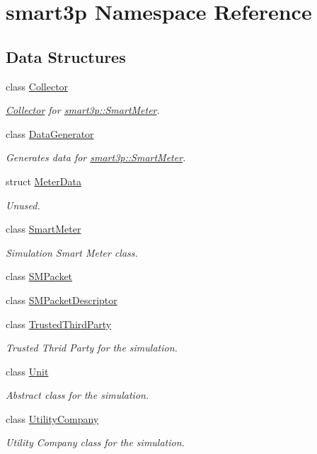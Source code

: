 \hypertarget{namespacesmart3p}{}\section{smart3p Namespace Reference}
\label{namespacesmart3p}
\subsection*{Data Structures}
\begin{DoxyCompactItemize}
\item 
class \hyperlink{classsmart3p_1_1Collector}{Collector}
\begin{DoxyCompactList}\small\item\em \hyperlink{classsmart3p_1_1Collector}{Collector} for \hyperlink{classsmart3p_1_1SmartMeter}{smart3p\+::\+Smart\+Meter}. \end{DoxyCompactList}\item 
class \hyperlink{classsmart3p_1_1DataGenerator}{Data\+Generator}
\begin{DoxyCompactList}\small\item\em Generates data for \hyperlink{classsmart3p_1_1SmartMeter}{smart3p\+::\+Smart\+Meter}. \end{DoxyCompactList}\item 
struct \hyperlink{structsmart3p_1_1MeterData}{Meter\+Data}
\begin{DoxyCompactList}\small\item\em Unused. \end{DoxyCompactList}\item 
class \hyperlink{classsmart3p_1_1SmartMeter}{Smart\+Meter}
\begin{DoxyCompactList}\small\item\em Simulation Smart Meter class. \end{DoxyCompactList}\item 
class \hyperlink{classsmart3p_1_1SMPacket}{S\+M\+Packet}
\item 
class \hyperlink{classsmart3p_1_1SMPacketDescriptor}{S\+M\+Packet\+Descriptor}
\item 
class \hyperlink{classsmart3p_1_1TrustedThirdParty}{Trusted\+Third\+Party}
\begin{DoxyCompactList}\small\item\em Trusted Thrid Party for the simulation. \end{DoxyCompactList}\item 
class \hyperlink{classsmart3p_1_1Unit}{Unit}
\begin{DoxyCompactList}\small\item\em Abstract class for the simulation. \end{DoxyCompactList}\item 
class \hyperlink{classsmart3p_1_1UtilityCompany}{Utility\+Company}
\begin{DoxyCompactList}\small\item\em Utility Company class for the simulation. \end{DoxyCompactList}\end{DoxyCompactItemize}
